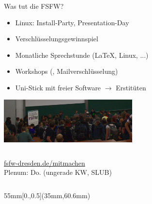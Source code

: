 \documentclass[t]{beamer}
\begin{document}
\begin{frame}[label=ct1]{\color{fg}Was tut die FSFW? }
  \begin{itemize}
   \item Linux: Install-Party, Presentation-Day
   \item Verschlüsselungsgewinnspiel
   \item Monatliche {Sprechstunde} (\LaTeX, Linux, ...)
   \item Workshops (, Mailverschlüsselung)
   \item Uni-Stick mit freier Software $\rightarrow$ Erstitüten
  \end{itemize}
  \begin{center}
   \pause
   \includegraphics[width=70mm]{img-src/stick-ausgabe-2017}
  \end{center}
\end{frame}



\begin{frame}[label=ct5]{\color{fg}{}}
 \vspace{6mm}


\begin{columns}

\begin{flushright}
\huge
\url{fsfw-dresden.de/mitmachen}\\
{\tiny Plenum: Do. (ungerade KW, SLUB)}\\[3mm]
\end{flushright}
~
\end{columns}

 
  \begin{textblock*}{55mm}[0.,0.5](35mm,60.6mm)
 \end{textblock*}




\end{frame}
\end{document}
